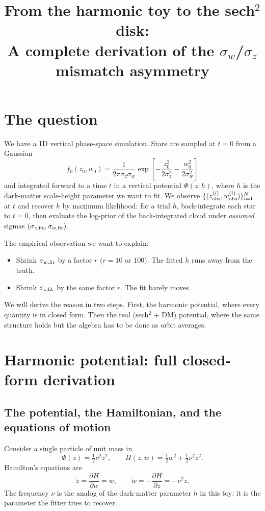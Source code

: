 \documentclass[11pt]{article}
\title{From the harmonic toy to the sech$^2$ disk:\\
A complete derivation of the $\sigma_w$/$\sigma_z$ mismatch asymmetry}
\author{}
\date{}
\begin{document}
\maketitle

\section{The question}

We have a 1D vertical phase-space simulation. Stars are sampled at $t=0$ from a Gaussian
\begin{equation}
f_0(z_0,w_0)=\frac{1}{2\pi\sigma_z\sigma_w}\exp\!\left[-\frac{z_0^2}{2\sigma_z^2}-\frac{w_0^2}{2\sigma_w^2}\right]
\label{eq:f0}
\end{equation}
and integrated forward to a time $t$ in a vertical potential $\Phi(z;h)$, where $h$ is the
dark-matter scale-height parameter we want to fit. We observe
$\{(z_{\rm obs}^{(i)},w_{\rm obs}^{(i)})\}_{i=1}^{N}$ at $t$ and recover $h$ by maximum
likelihood: for a trial $h$, back-integrate each star to $t=0$, then evaluate the
log-prior of the back-integrated cloud under \emph{assumed} sigmas
$(\sigma_{z,\rm fit},\sigma_{w,\rm fit})$.

The empirical observation we want to explain:
\begin{itemize}
\item Shrink $\sigma_{w,\rm fit}$ by a factor $r$ ($r=10$ or $100$). The fitted $h$ runs
away from the truth.
\item Shrink $\sigma_{z,\rm fit}$ by the same factor $r$. The fit barely moves.
\end{itemize}
We will derive the reason in two steps. First, the harmonic potential, where every
quantity is in closed form. Then the real (sech$^2$ + DM) potential, where the same
structure holds but the algebra has to be done as orbit averages.

\section{Harmonic potential: full closed-form derivation}

\subsection{The potential, the Hamiltonian, and the equations of motion}

Consider a single particle of unit mass in
\begin{equation}
\Phi(z) = \tfrac12\nu^2 z^2,
\qquad
H(z,w) = \tfrac12 w^2 + \tfrac12\nu^2 z^2.
\end{equation}
Hamilton's equations are
\begin{equation}
\dot z = \frac{\partial H}{\partial w} = w,
\qquad
\dot w = -\frac{\partial H}{\partial z} = -\nu^2 z.
\label{eq:eom-harm}
\end{equation}
The frequency $\nu$ is the analog of the dark-matter parameter $h$ in this toy: it is
the parameter the fitter tries to recover.
\end{document}
